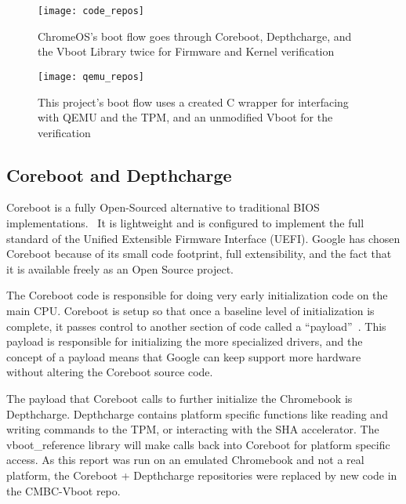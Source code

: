 \begin{figure}
  \centering
  \texttt{[image: code\_repos]}
  \caption[Vboot Repository layout]{ChromeOS's boot flow goes through Coreboot, Depthcharge, and the Vboot Library twice for Firmware and Kernel verification}\label{fig:code_repos}
\end{figure}

\begin{figure}
  \centering
  \texttt{[image: qemu\_repos]}
  \caption[This project's Repository Layout]{This project's boot flow uses a
      created C wrapper for interfacing with QEMU and the TPM, and an unmodified Vboot for the verification}\label{fig:qemu_repos}
\end{figure}

\subsection{Coreboot and Depthcharge}\label{coreboot}

Coreboot is a fully Open-Sourced alternative to traditional BIOS implementations.~\cite{coreboot}
It is lightweight and is configured to implement the full standard of the Unified Extensible Firmware Interface (UEFI).
Google has chosen Coreboot because of its small code footprint, full extensibility, and the fact that it is available freely as an Open Source project.

The Coreboot code is responsible for doing very early initialization code on the main CPU\@. 
Coreboot is setup so that once a baseline level of initialization is complete, it passes control to another section of code called a ``payload''~\cite{coreboot-payload}.
This payload is responsible for initializing the more specialized drivers, and the concept of a payload means that Google can keep support more hardware without altering the Coreboot source code.

The payload that Coreboot calls to further initialize the Chromebook is Depthcharge.
Depthcharge contains platform specific functions like reading and writing
commands to the TPM, or interacting with the SHA accelerator. 
The vboot\_reference library will make calls back into Coreboot for platform
specific access. 
As this report was run on an emulated Chromebook and not a real platform, the
Coreboot + Depthcharge repositories were replaced by new code in the CMBC-Vboot
repo.

